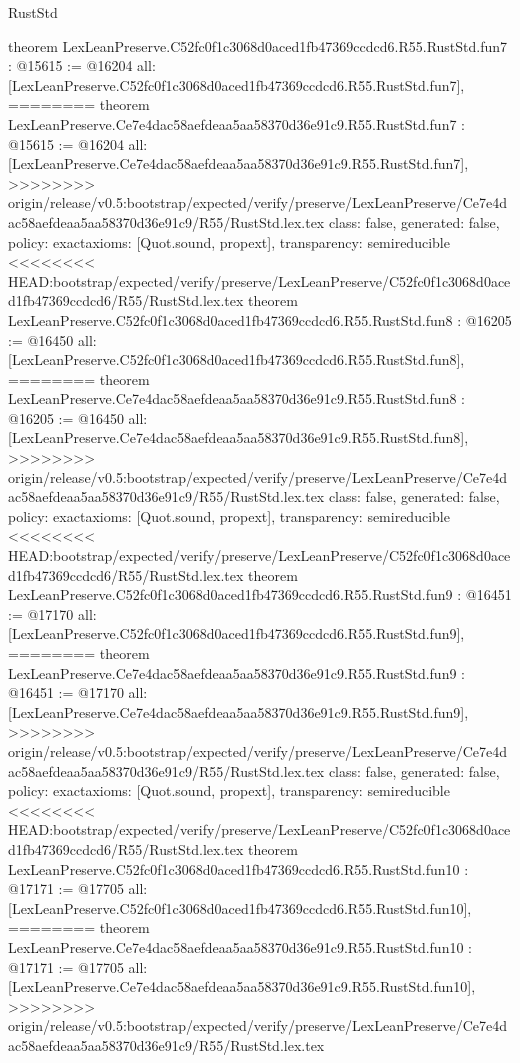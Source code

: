 \begin{lexlean}{RustStd}
\begin{coremodule}
{\begin{coremodule}
{{{{{{{{{theorem LexLeanPreserve.C52fc0f1c3068d0aced1fb47369ccdcd6.R55.RustStd.fun7 : @15615 := @16204 {
  all: [LexLeanPreserve.C52fc0f1c3068d0aced1fb47369ccdcd6.R55.RustStd.fun7],
========
theorem LexLeanPreserve.Ce7e4dac58aefdeaa5aa58370d36e91c9.R55.RustStd.fun7 : @15615 := @16204 {
  all: [LexLeanPreserve.Ce7e4dac58aefdeaa5aa58370d36e91c9.R55.RustStd.fun7],
>>>>>>>> origin/release/v0.5:bootstrap/expected/verify/preserve/LexLeanPreserve/Ce7e4dac58aefdeaa5aa58370d36e91c9/R55/RustStd.lex.tex
  class: false,
  generated: false,
  policy: exact{axioms: [Quot.sound, propext]},
  transparency: semireducible
}
<<<<<<<< HEAD:bootstrap/expected/verify/preserve/LexLeanPreserve/C52fc0f1c3068d0aced1fb47369ccdcd6/R55/RustStd.lex.tex
theorem LexLeanPreserve.C52fc0f1c3068d0aced1fb47369ccdcd6.R55.RustStd.fun8 : @16205 := @16450 {
  all: [LexLeanPreserve.C52fc0f1c3068d0aced1fb47369ccdcd6.R55.RustStd.fun8],
========
theorem LexLeanPreserve.Ce7e4dac58aefdeaa5aa58370d36e91c9.R55.RustStd.fun8 : @16205 := @16450 {
  all: [LexLeanPreserve.Ce7e4dac58aefdeaa5aa58370d36e91c9.R55.RustStd.fun8],
>>>>>>>> origin/release/v0.5:bootstrap/expected/verify/preserve/LexLeanPreserve/Ce7e4dac58aefdeaa5aa58370d36e91c9/R55/RustStd.lex.tex
  class: false,
  generated: false,
  policy: exact{axioms: [Quot.sound, propext]},
  transparency: semireducible
}
<<<<<<<< HEAD:bootstrap/expected/verify/preserve/LexLeanPreserve/C52fc0f1c3068d0aced1fb47369ccdcd6/R55/RustStd.lex.tex
theorem LexLeanPreserve.C52fc0f1c3068d0aced1fb47369ccdcd6.R55.RustStd.fun9 : @16451 := @17170 {
  all: [LexLeanPreserve.C52fc0f1c3068d0aced1fb47369ccdcd6.R55.RustStd.fun9],
========
theorem LexLeanPreserve.Ce7e4dac58aefdeaa5aa58370d36e91c9.R55.RustStd.fun9 : @16451 := @17170 {
  all: [LexLeanPreserve.Ce7e4dac58aefdeaa5aa58370d36e91c9.R55.RustStd.fun9],
>>>>>>>> origin/release/v0.5:bootstrap/expected/verify/preserve/LexLeanPreserve/Ce7e4dac58aefdeaa5aa58370d36e91c9/R55/RustStd.lex.tex
  class: false,
  generated: false,
  policy: exact{axioms: [Quot.sound, propext]},
  transparency: semireducible
}
<<<<<<<< HEAD:bootstrap/expected/verify/preserve/LexLeanPreserve/C52fc0f1c3068d0aced1fb47369ccdcd6/R55/RustStd.lex.tex
theorem LexLeanPreserve.C52fc0f1c3068d0aced1fb47369ccdcd6.R55.RustStd.fun10 : @17171 := @17705 {
  all: [LexLeanPreserve.C52fc0f1c3068d0aced1fb47369ccdcd6.R55.RustStd.fun10],
========
theorem LexLeanPreserve.Ce7e4dac58aefdeaa5aa58370d36e91c9.R55.RustStd.fun10 : @17171 := @17705 {
  all: [LexLeanPreserve.Ce7e4dac58aefdeaa5aa58370d36e91c9.R55.RustStd.fun10],
>>>>>>>> origin/release/v0.5:bootstrap/expected/verify/preserve/LexLeanPreserve/Ce7e4dac58aefdeaa5aa58370d36e91c9/R55/RustStd.lex.tex
}}}}}}}}}}}}}}
\end{coremodule}}
\end{coremodule}
\end{lexlean}
